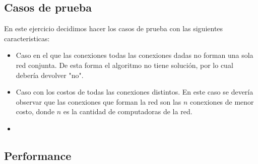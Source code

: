 \newpage

\subsection{Casos de prueba}

En este ejercicio decidimos hacer los casos de prueba con las siguientes caracteristicas:

\begin{itemize}
\item Caso en el que las conexiones todas las conexiones dadas no forman una sola red conjunta. De esta forma el algoritmo no tiene solución, por lo cual debería devolver "no".
\item Caso con los costos de todas las conexiones distintos. En este caso se devería observar que las conexiones que forman la red son las $n$ conexiones de menor costo, donde $n$ es la cantidad de computadoras de la red.
\item 
\end{itemize}


\newpage

\subsection{Performance}

